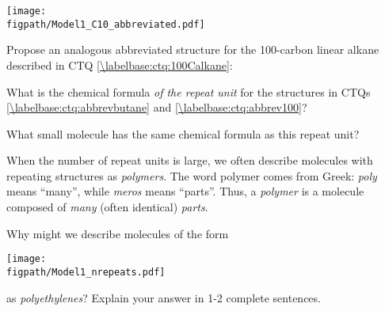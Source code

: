 \begin{activity}
\begin{ctqs}
		\vspace{6pt}
		\centerline{\texttt{[image: \\figpath/Model1\_C10\_abbreviated.pdf]}}
		
		\begin{solution}[1.25in]
		\end{solution}
	
	\question Propose an analogous abbreviated structure for the 100-carbon linear alkane described in CTQ \ref{\labelbase:ctq:100Calkane}: \label{\labelbase:ctq:abbrev100}
		
		\begin{solution}[0.75in]
		\end{solution}
	
	\question What is the chemical formula \emph{of the repeat unit} for the structures in CTQs \ref{\labelbase:ctq:abbrevbutane} and \ref{\labelbase:ctq:abbrev100}?
		
		\begin{solution}[0.75in]
		\end{solution}
	
	\question What small molecule has the same chemical formula as this repeat unit?
		
		\begin{solution}[0.75in]
		\end{solution}
	
\end{ctqs}

\begin{infobox}
	When the number of repeat units is large, we often describe molecules with repeating structures as \emph{polymers}.  The word polymer comes from Greek: \emph{poly} means ``many'', while \emph{meros} means ``parts''.  Thus, a \emph{polymer} is a molecule composed of \emph{many} (often identical) \emph{parts}.
\end{infobox}

\begin{ctqs}
	\question Why might we describe molecules of the form
	
		\centerline{\texttt{[image: \\figpath/Model1\_nrepeats.pdf]}}
			
		as \emph{polyethylenes}?  Explain your answer in 1-2 complete sentences.
		
		\begin{solution}[2in]
		\end{solution}
\end{ctqs}

\clearpage
\begin{model}
	\label{\labelbase:mdl:hydrocarbonmelting}


\end{model}
\end{activity}

